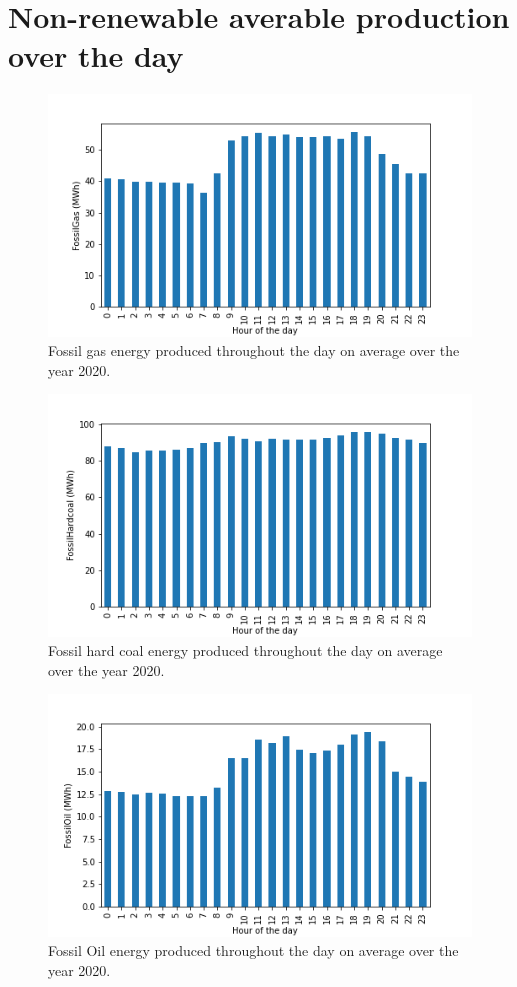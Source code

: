 \documentclass[11pt]{article} %
\begin{document}
\clearpage\newpage
\section{Non-renewable averable production over the day}\label{app:non_renewable}
\begin{figure}[h!]
  \includegraphics[width=0.8\linewidth]{../outputs/FossilGas.png}
  \caption{Fossil gas energy produced throughout the day on average over the year 2020.}
  \label{fig:gas_kwh}
\end{figure}
\begin{figure}[h!]
  \includegraphics[width=0.8\linewidth]{../outputs/FossilHardcoal.png}
  \caption{Fossil hard coal energy produced throughout the day on average over the year 2020.}
  \label{fig:coal_kwh}
\end{figure}
\begin{figure}[h!]
  \includegraphics[width=0.8\linewidth]{../outputs/FossilOil.png}
  \caption{Fossil Oil energy produced throughout the day on average over the year 2020.}
  \label{fig:oil_kwh}
\end{figure}
\end{document}
